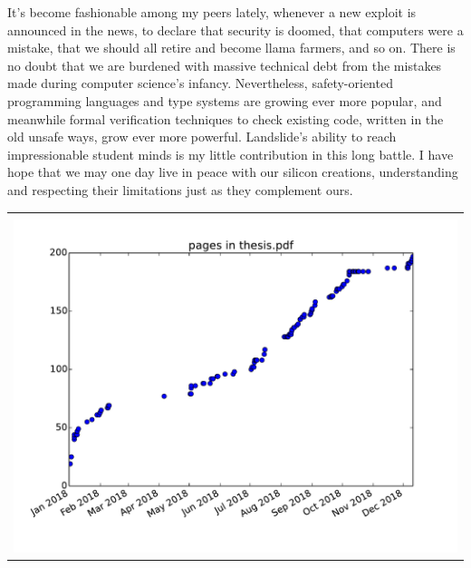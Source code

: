 \documentclass[12pt]{cmuthesis}
\begin{document}
It's become fashionable among my peers lately,
whenever a new exploit is announced in the news,
to declare that security is doomed,
that computers were a mistake,
that we should all retire and become llama farmers,
and so on.
There is no doubt that we are burdened with massive technical debt from the mistakes made
during computer science's infancy.
Nevertheless,
safety-oriented programming languages and type systems are growing ever more popular,
and meanwhile formal verification techniques to check existing code,
written in the old unsafe ways, grow ever more powerful.
Landslide's ability to reach impressionable student minds is my little contribution in this long battle.
I have hope that we may one day live in peace with our silicon creations,
understanding and respecting their limitations just as they complement ours.

\newpage
\thispagestyle{empty}
\begin{center}
\begin{tabular}{c}
\vspace{12em} \\
\includegraphics[width=\textwidth]{pages.pdf}
\end{tabular}
\end{center}

%
\end{document}

